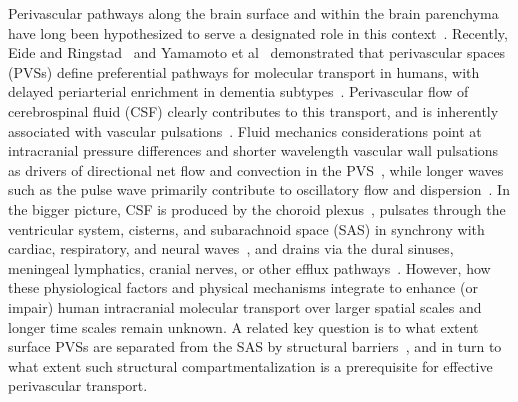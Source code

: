 \documentclass[fleqn,10pt]{wlscirep}
\begin{document}
Perivascular pathways along the brain surface and within the brain
parenchyma have long been hypothesized to serve a designated role in
this context~\cite{rennels1985evidence, zhang1990interrelationships,
  ichimura1991distribution, carare2008solutes, iliff2012paravascular,
  foley2012realtime, hannocks2018molecular, van2024caa}. Recently, Eide and
Ringstad~\cite{eide2024functional} and Yamamoto et
al~\cite{yamamoto2024perivascular} demonstrated that perivascular
spaces (PVSs) define preferential pathways for molecular transport in
humans, with delayed periarterial enrichment in dementia
subtypes~\cite{eide2024functional}. Perivascular flow of cerebrospinal
fluid (CSF) clearly contributes to this transport, and is inherently
associated with vascular pulsations~\cite{hadaczek2006perivascular,
  iliff2013cerebral, bedussi2018paravascular, mestre2018flow,
  boster2023artificial, hirschler2024region}. Fluid mechanics
considerations point at intracranial pressure differences and shorter
wavelength vascular wall pulsations as drivers of directional net flow
and convection in the PVS~\cite{bilston2003arterial, rey2018pulsatile,
  daversin2020mechanisms, kedarasetti2020functional,
  gjerde2023directional, nozaleda2024arterial}, while longer waves
such as the pulse wave primarily contribute to oscillatory flow and
dispersion~\cite{asgari2016glymphatic, sharp2019dispersion, thomas2019fluid,
  kedarasetti2020arterial, troyetsky2021dispersion, 
  martinac2021phase}. In the bigger picture, CSF is produced by the
choroid plexus~\cite{damkier2013cerebrospinal,
  steffensen2018cotransporter, liu2020direct}, pulsates through the
ventricular system, cisterns, and subarachnoid space (SAS) in
synchrony with cardiac, respiratory, and neural
waves~\cite{greitz1993pulsatile, wagshul2011pulsating,
  sweetman2011cerebrospinal, fultz2019coupled, vinje2019respiratory,
  eide2021direction, causemann2022human, williams2023neural,
  zimmermann2023total}, and drains via the dural sinuses, meningeal
lymphatics, cranial nerves, or other efflux
pathways~\cite{proulx2021cerebrospinal}. However, how these
physiological factors and physical mechanisms integrate to enhance (or
impair) human intracranial molecular transport over larger spatial
scales and longer time scales remain unknown. A related key question
is to what extent surface PVSs are separated from the SAS by
structural barriers~\cite{zhang1990interrelationships,
  weller2005microscopic, bedussi2017paravascular,
  pizzo2018intrathecal, mestre2022periarteriolar,
  mollgard2023mesothelium, smets2024perivascular, eide2024functional},
and in turn to what extent such structural compartmentalization is a
prerequisite for effective perivascular transport.
 
\end{document}
